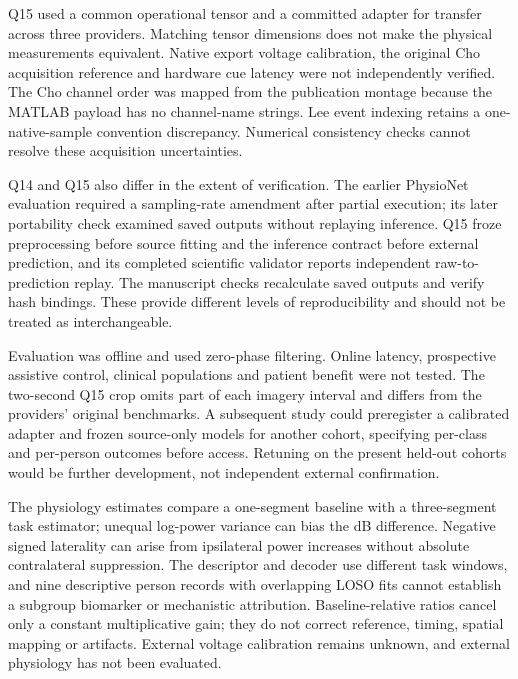 \documentclass[11pt]{article}
\begin{document}
Q15 used a common operational tensor and a committed adapter for transfer across three providers. Matching tensor dimensions does not make the physical measurements equivalent. Native export voltage calibration, the original Cho acquisition reference and hardware cue latency were not independently verified. The Cho channel order was mapped from the publication montage because the MATLAB payload has no channel-name strings. Lee event indexing retains a one-native-sample convention discrepancy. Numerical consistency checks cannot resolve these acquisition uncertainties.

Q14 and Q15 also differ in the extent of verification. The earlier PhysioNet evaluation required a sampling-rate amendment after partial execution; its later portability check examined saved outputs without replaying inference. Q15 froze preprocessing before source fitting and the inference contract before external prediction, and its completed scientific validator reports independent raw-to-prediction replay. The manuscript checks recalculate saved outputs and verify hash bindings. These provide different levels of reproducibility and should not be treated as interchangeable.

Evaluation was offline and used zero-phase filtering. Online latency, prospective assistive control, clinical populations and patient benefit were not tested. The two-second Q15 crop omits part of each imagery interval and differs from the providers' original benchmarks. A subsequent study could preregister a calibrated adapter and frozen source-only models for another cohort, specifying per-class and per-person outcomes before access. Retuning on the present held-out cohorts would be further development, not independent external confirmation.

The physiology estimates compare a one-segment baseline with a three-segment task estimator; unequal log-power variance can bias the dB difference. Negative signed laterality can arise from ipsilateral power increases without absolute contralateral suppression. The descriptor and decoder use different task windows, and nine descriptive person records with overlapping LOSO fits cannot establish a subgroup biomarker or mechanistic attribution. Baseline-relative ratios cancel only a constant multiplicative gain; they do not correct reference, timing, spatial mapping or artifacts. External voltage calibration remains unknown, and external physiology has not been evaluated.
\end{document}
